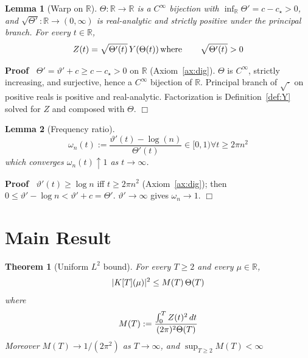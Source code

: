 \documentclass{article}
\newcommand{\assign}{:=}
\newcommand{\tmop}[1]{\ensuremath{\operatorname{#1}}}
\newenvironment{proof}{\noindent\textbf{Proof\ }}{\hspace*{\fill}$\Box$\medskip}
\newtheorem{lemma}{Lemma}
\newtheorem{theorem}{Theorem}
\newcommand{\R}{\mathbb{R}}
\begin{document}
\begin{lemma}
  [Warp on $\R$]\label{lem:warp} $\Theta : \R \to \R$ is a $C^{\infty}$
  bijection with $\inf_{\R} \Theta' = c - c_{\star} > 0$, and $\sqrt{\Theta'}
  : \R \to (0, \infty)$ is real-analytic and strictly positive under the
  principal branch. For every $t \in \R$,
  \begin{equation}
    Z (t) = \sqrt{\Theta' (t)} \hspace{0.17em} Y (\Theta (t)) \tmop{where}
    \qquad \sqrt{\Theta' (t)} > 0
  \end{equation}
\end{lemma}

\begin{proof}
  $\Theta' = \vartheta' + c \ge c - c_{\star} > 0$ on $\R$
  (Axiom~\ref{ax:dig}). $\Theta$ is $C^{\infty}$, strictly increasing, and
  surjective, hence a $C^{\infty}$ bijection of $\R$. Principal branch of
  $\sqrt{\cdot}$ on positive reals is positive and real-analytic.
  Factorization is Definition~\ref{def:Y} solved for $Z$ and composed with
  $\Theta$.
\end{proof}

\begin{lemma}
  [Frequency ratio]\label{lem:freq}
  \begin{equation}
    \omega_n (t) \assign \frac{\vartheta' (t) - \log (n)}{\Theta' (t)} \in [0,
    1) \forall t \ge 2 \pi n^2
  \end{equation}
  which converges $\omega_n (t) \uparrow 1$ as $t \to \infty$.
\end{lemma}

\begin{proof}
  $\vartheta' (t) \ge \log n$ iff $t \ge 2 \pi n^2$ (Axiom~\ref{ax:dig}); then
  $0 \le \vartheta' - \log n < \vartheta' + c = \Theta'$. $\vartheta' \to
  \infty$ gives $\omega_n \to 1$.
\end{proof}

\section{Main Result}

\begin{theorem}
  [Uniform $L^2$ bound]\label{thm:bdd} For every $T \ge 2$ and every $\mu \in
  \R$,
  \begin{equation}
    |K [T] (\mu) |^2 \le M (T)  \hspace{0.17em} \Theta (T)
  \end{equation}
  where
  \begin{equation}
    M (T) \assign \frac{\int_0^T Z (t)^2  \hspace{0.17em} dt}{(2 \pi)^2 \Theta
    (T)}
  \end{equation}
  Moreover $M (T) \to 1 / (2 \pi^2)$ as $T \to \infty$, and $\sup_{T \ge 2} M
  (T) < \infty$
\end{theorem}
\end{document}
